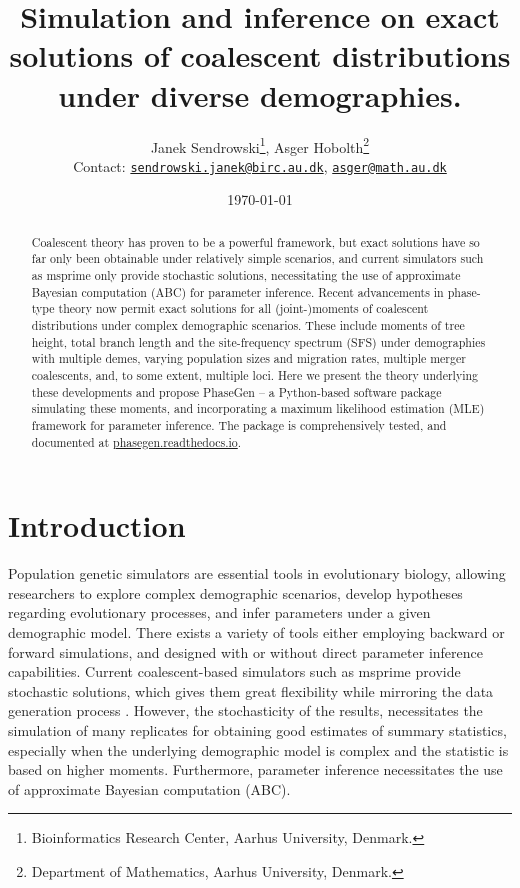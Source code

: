 \documentclass[hidelinks,11pt]{article}
\title{Simulation and inference on exact solutions of coalescent distributions under diverse demographies.}
\author{Janek Sendrowski\thanks{Bioinformatics Research Center, Aarhus University, Denmark.}, Asger Hobolth\thanks{Department of Mathematics, Aarhus University, Denmark.}\\
Contact:
\href{mailto:sendrowski.janek@birc.au.dk}{\texttt{sendrowski.janek@birc.au.dk}},
\href{mailto:asger@math.au.dk}{\texttt{asger@math.au.dk}}}
\date{\today}
\begin{document}
\maketitle


\begin{abstract}
Coalescent theory has proven to be a powerful framework, but exact solutions have so far only been obtainable under relatively simple scenarios, and current simulators such as msprime only provide stochastic solutions, necessitating the use of approximate Bayesian computation (ABC) for parameter inference. Recent advancements in phase-type theory now permit exact solutions for all (joint-)moments of coalescent distributions under complex demographic scenarios. These include moments of tree height, total branch length and the site-frequency spectrum (SFS) under demographies with multiple demes, varying population sizes and migration rates, multiple merger coalescents, and, to some extent, multiple loci. Here we present the theory underlying these developments and propose PhaseGen -- a Python-based software package simulating these moments, and incorporating a maximum likelihood estimation (MLE) framework for parameter inference. The package is comprehensively tested, and documented at \href{https://phasegen.readthedocs.io}{\url{phasegen.readthedocs.io}}.
\end{abstract}

\section{Introduction}
Population genetic simulators are essential tools in evolutionary biology, allowing researchers to explore complex demographic scenarios, develop hypotheses regarding evolutionary processes, and infer parameters under a given demographic model.
There exists a variety of tools either employing backward or forward simulations, and designed with or without direct parameter inference capabilities. 
Current coalescent-based simulators such as msprime provide stochastic solutions, which gives them great flexibility while mirroring the data generation process \citep{msprime}. %
However, the stochasticity of the results, necessitates the simulation of many replicates for obtaining good estimates of summary statistics, especially when the underlying demographic model is complex and the statistic is based on higher moments.
Furthermore, parameter inference necessitates the use of approximate Bayesian computation (ABC).
\end{document}
